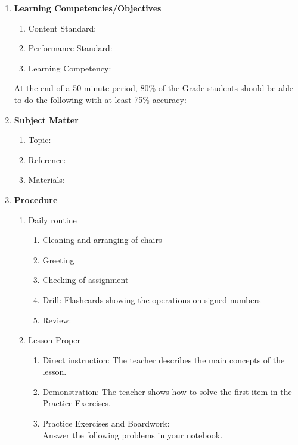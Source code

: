 \begin{enumerate}[label = \textbf{\Roman*. }]
\item \textbf{Learning Competencies/Objectives }

\begin{enumerate}[label = \Alph*. ]
\item Content Standard: \ContentStandard
\item Performance Standard: \PerformanceStandard
\item Learning Competency: \LearningCompetency
\end{enumerate}   

At the end of a 50-minute period, 80\% of the Grade \Grade students should be able to do the following with at least 75\% accuracy:
	\begin{enumerate}[label = \alph*. ]
	\Objectives 
	\end{enumerate}
	
\item \textbf{Subject Matter}
	\begin{enumerate}[label = \Alph*. ]
	\item Topic: \Topic
	\item Reference: \Reference
	\item Materials: \Materials
	\end{enumerate}

\item	 \textbf{Procedure}
	\begin{enumerate}[label = \Alph*. ]
	\item Daily routine
		\begin{enumerate}[label = \arabic*. ]
		\item Cleaning and arranging of chairs
		\item Greeting 
		\item Checking of assignment 
		\item Drill: Flashcards showing the operations on signed numbers 
		\item Review: \ReviewTopic
		\end{enumerate}
		
	\item Lesson Proper 
		\begin{enumerate}[label = \arabic*. ]
		\item Direct instruction: The teacher describes the main concepts of the lesson. \DirectInstruction
		\item Demonstration: The teacher shows how to solve the first item in the Practice Exercises. 
		\item Practice Exercises and Boardwork: \\%
		Answer the following problems in your notebook. \\
		{\PE}
			

\end{enumerate}
\end{enumerate}
\end{enumerate}
